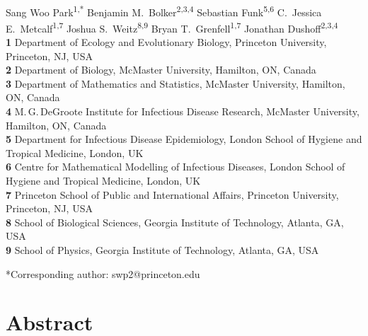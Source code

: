 \documentclass[12pt]{article}
\date{\today}
\begin{document}
\begin{flushleft}{
	\Large
	\textbf{}
}
\newline
\\
Sang Woo Park\textsuperscript{1,*}
Benjamin M.\ Bolker\textsuperscript{2,3,4}
Sebastian Funk\textsuperscript{5,6}
C.\ Jessica E.\ Metcalf\textsuperscript{1,7}
Joshua S.\ Weitz\textsuperscript{8,9}
Bryan T.\ Grenfell\textsuperscript{1,7}
Jonathan Dushoff\textsuperscript{2,3,4}
\\
\bigskip
\textbf{1} Department of Ecology and Evolutionary Biology, Princeton University, Princeton, NJ, USA
\\
\textbf{2} Department of Biology, McMaster University, Hamilton, ON, Canada
\\
\textbf{3} Department of Mathematics and Statistics, McMaster University, Hamilton, ON, Canada
\\
\textbf{4} M.\,G.\,DeGroote Institute for Infectious Disease Research, McMaster University, Hamilton, ON, Canada
\\
\textbf{5} Department for Infectious Disease Epidemiology, London School of Hygiene and Tropical Medicine, London, UK
\\
\textbf{6} Centre for Mathematical Modelling of Infectious Diseases, London School of Hygiene and Tropical Medicine, London, UK
\\
\textbf{7} Princeton School of Public and International Affairs, Princeton University, Princeton, NJ, USA
\\
\textbf{8} School of Biological Sciences, Georgia Institute of Technology, Atlanta, GA, USA
\\
\textbf{9} School of Physics, Georgia Institute of Technology, Atlanta, GA, USA
\\
\bigskip

*Corresponding author: swp2@princeton.edu
\bigskip

\end{flushleft}


\section*{Abstract}
\end{document}
